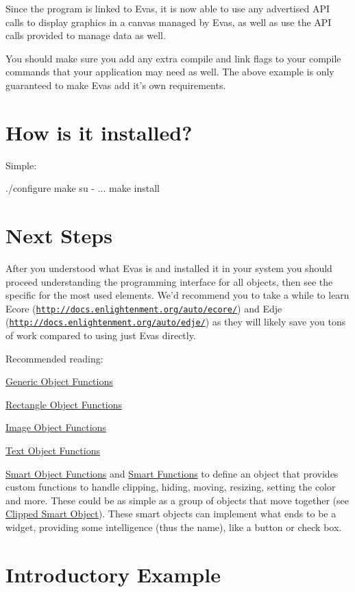 Since the program is linked to Evas, it is now able to use any advertised API calls to display graphics in a canvas managed by Evas, as well as use the API calls provided to manage data as well.

You should make sure you add any extra compile and link flags to your compile commands that your application may need as well. The above example is only guaranteed to make Evas add it's own requirements.\hypertarget{index_install}{}\section{How is it installed?}\label{index_install}
Simple:

\begin{DoxyVerb}
./configure
make
su -
...
make install
\end{DoxyVerb}
\hypertarget{index_next_steps}{}\section{Next Steps}\label{index_next_steps}
After you understood what Evas is and installed it in your system you should proceed understanding the programming interface for all objects, then see the specific for the most used elements. We'd recommend you to take a while to learn Ecore (\href{http://docs.enlightenment.org/auto/ecore/}{\tt http://docs.enlightenment.org/auto/ecore/}) and Edje (\href{http://docs.enlightenment.org/auto/edje/}{\tt http://docs.enlightenment.org/auto/edje/}) as they will likely save you tons of work compared to using just Evas directly.

Recommended reading:

\begin{DoxyItemize}
\item \hyperlink{group__Evas__Object__Group}{Generic Object Functions} \item \hyperlink{group__Evas__Object__Rectangle}{Rectangle Object Functions} \item \hyperlink{group__Evas__Object__Image}{Image Object Functions} \item \hyperlink{group__Evas__Object__Text}{Text Object Functions} \item \hyperlink{group__Evas__Smart__Object__Group}{Smart Object Functions} and \hyperlink{group__Evas__Smart__Group}{Smart Functions} to define an object that provides custom functions to handle clipping, hiding, moving, resizing, setting the color and more. These could be as simple as a group of objects that move together (see \hyperlink{group__Evas__Smart__Object__Clipped}{Clipped Smart Object}). These smart objects can implement what ends to be a widget, providing some intelligence (thus the name), like a button or check box.\end{DoxyItemize}
\hypertarget{index_intro_example}{}\section{Introductory Example}\label{index_intro_example}

